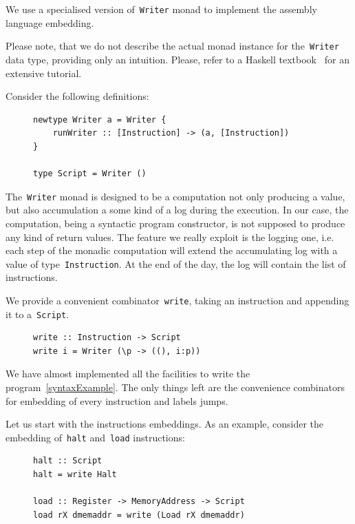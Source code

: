 We use a specialised version of~\texttt{Writer} monad
to implement the assembly language embedding.

Please note, that we do not describe the actual monad instance for
the~\texttt{Writer} data type, providing only an intuition.
Please, refer to a Haskell textbook~\cite{Lipovaca:2011:LYH:2018642} for an
extensive tutorial.

Consider the following definitions:

\begin{figure}[H]
\begin{verbatim}
newtype Writer a = Writer {
    runWriter :: [Instruction] -> (a, [Instruction])
}

type Script = Writer ()
\end{verbatim}
\end{figure}

The~\texttt{Writer} monad is designed to be a computation not only
producing a value, but also accumulation a some kind of a log during the execution.
In our case, the computation, being a syntactic program constructor, is not supposed
to produce any kind of return values. The feature we really exploit is the logging one,
i.e. each step of the monadic computation will extend the accumulating log with a
value of type~\texttt{Instruction}. At the end of the day, the log will
contain the list of instructions.

We provide a convenient combinator~\texttt{write}, taking an instruction
and appending it to a~\texttt{Script}.

\begin{figure}[H]
\begin{verbatim}
write :: Instruction -> Script
write i = Writer (\p -> ((), i:p))
\end{verbatim}
\end{figure}

We have almost implemented all the facilities to write the program~\ref{syntaxExample}.
The only things left are the convenience combinators for embedding of every instruction
and labels jumps.

Let us start with the instructions embeddings. As an example, consider the
embedding of~\texttt{halt} and~\texttt{load} instructions:

\begin{figure}[H]
\begin{verbatim}
halt :: Script
halt = write Halt

load :: Register -> MemoryAddress -> Script
load rX dmemaddr = write (Load rX dmemaddr)
\end{verbatim}
\end{figure}

